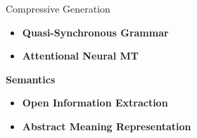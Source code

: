 \documentclass[xcolor={table}]{beamer}
\begin{document}
\begin{frame}{Compressive Generation}

    \begin{itemize}
      \item \textbf{Quasi-Synchronous Grammar} 
       {\scriptsize \citep{woodsend2010generation}}
      \item \textbf{Attentional Neural MT}
       {\scriptsize \citep{rush2015neural}}
    \end{itemize}

    \textbf{Semantics}
    \begin{itemize}
      \item \textbf{Open Information Extraction} 
       {\scriptsize \citep{pighin2014modelling}}
      \item \textbf{Abstract Meaning Representation} 
       {\scriptsize \citep{liu2015toward}}
    \end{itemize}
\end{frame}
    
\end{document}
